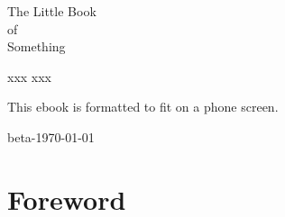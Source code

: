 \documentclass[oneside,11pt]{memoir}
\begin{document}
\thispagestyle{empty}

\begin{center}


{\huge The Little Book\\[0.75ex] of\\[1.75ex] Something}

\vspace*{4ex}

xxx xxx


\end{center}

\newpage



This ebook is formatted to fit on a phone screen.


\begin{flushright}
\footnotesize beta-\dotdate\today
\end{flushright}

\vspace*{-3ex}

\newpage


{
\everymath{\color{black}}
\tableofcontents* %
}

\clearpage

\listoffigures*
{}


\chapter*{Foreword}

\end{document}

